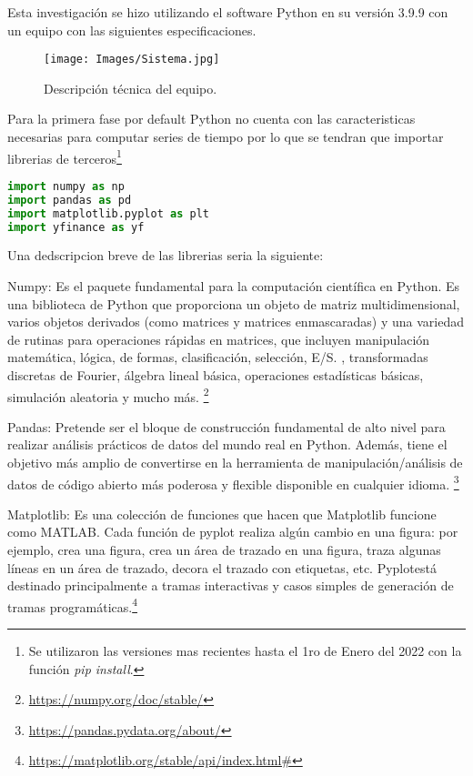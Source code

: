 \documentclass[letterpaper,12pt,oneside]{book}
\begin{document}
Esta investigación se hizo utilizando el software Python en su versión 3.9.9 con un equipo con las siguientes especificaciones.



\begin{figure}[ht]
	\centering
	\texttt{[image: Images/Sistema.jpg]}
	\caption{Descripción técnica del equipo.}
\end{figure}


Para la primera fase por default Python no cuenta con las caracteristicas necesarias para computar series de tiempo por lo que se tendran que importar librerias de terceros\footnote{Se utilizaron  las versiones mas recientes hasta el 1ro de Enero del 2022 con la función \textit{pip install}.}

\begin{lstlisting}[language=Python]
import numpy as np 
import pandas as pd 
import matplotlib.pyplot as plt
import yfinance as yf
\end{lstlisting}

Una dedscripcion breve de las librerias seria la siguiente:
\vspace{0.5cm}

Numpy: Es el paquete fundamental para la computación científica en Python. Es una biblioteca de Python que proporciona un objeto de matriz multidimensional, varios objetos derivados (como matrices y matrices enmascaradas) y una variedad de rutinas para operaciones rápidas en matrices, que incluyen manipulación matemática, lógica, de formas, clasificación, selección, E/S. , transformadas discretas de Fourier, álgebra lineal básica, operaciones estadísticas básicas, simulación aleatoria y mucho más. \footnote{\url{https://numpy.org/doc/stable/}}
\vspace{0.5cm}

Pandas: Pretende ser el bloque de construcción fundamental de alto nivel para realizar análisis prácticos de datos del mundo real en Python. Además, tiene el objetivo más amplio de convertirse en la herramienta de manipulación/análisis de datos de código abierto más poderosa y flexible disponible en cualquier idioma. \footnote{\url{https://pandas.pydata.org/about/}}
\vspace{0.5cm}

Matplotlib: Es una colección de funciones que hacen que Matplotlib funcione como MATLAB. Cada función de pyplot realiza algún cambio en una figura: por ejemplo, crea una figura, crea un área de trazado en una figura, traza algunas líneas en un área de trazado, decora el trazado con etiquetas, etc. Pyplotestá destinado principalmente a tramas interactivas y casos simples de generación de tramas programáticas.\footnote{\url{https://matplotlib.org/stable/api/index.html\#}}
\vspace{0.5cm}
\end{document}
